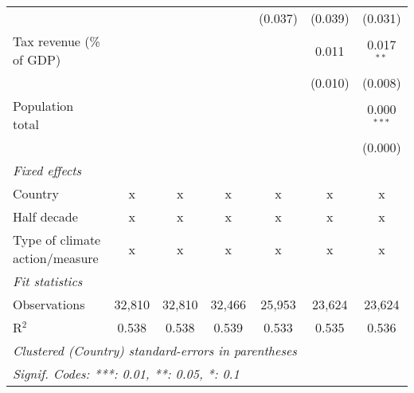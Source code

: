 \begin{tabular}{lcccccc}
                                                               &         &               &               & (0.037)       & (0.039)       & (0.031)\\   
   Tax revenue (\% of GDP)                                     &         &               &               &               & 0.011         & 0.017$^{**}$\\   
                                                               &         &               &               &               & (0.010)       & (0.008)\\   
   Population total                                            &         &               &               &               &               & 0.000$^{***}$\\   
                                                               &         &               &               &               &               & (0.000)\\   
   \emph{Fixed effects}\\
   Country                                                     & x       & x             & x             & x             & x             & x\\  
   Half decade                                                 & x       & x             & x             & x             & x             & x\\  
   Type of climate action/measure                              & x       & x             & x             & x             & x             & x\\  
   \midrule \emph{Fit statistics}\\
   Observations                                                & 32,810  & 32,810        & 32,466        & 25,953        & 23,624        & 23,624\\  
   R$^2$                                                       & 0.538   & 0.538         & 0.539         & 0.533         & 0.535         & 0.536\\  
   \midrule
   \multicolumn{7}{l}{\emph{Clustered (Country) standard-errors in parentheses}}\\
   \multicolumn{7}{l}{\emph{Signif. Codes: ***: 0.01, **: 0.05, *: 0.1}}\\
\end{tabular}
\par\endgroup



